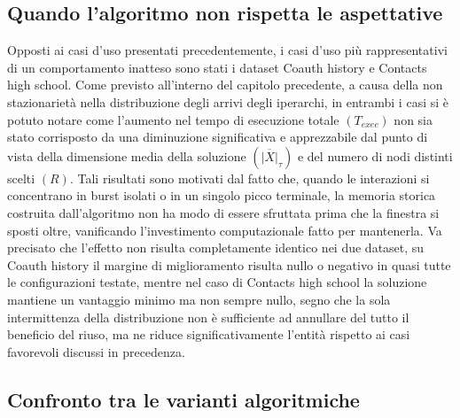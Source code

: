\subsection*{Quando l'algoritmo non rispetta le aspettative}

Opposti ai casi d'uso presentati precedentemente, i casi d'uso più rappresentativi di un comportamento inatteso sono stati i dataset Coauth history e Contacts high school.
Come previsto all'interno del capitolo precedente, a causa della non stazionarietà nella distribuzione degli arrivi degli iperarchi, in entrambi i casi si è potuto notare come l'aumento nel tempo di esecuzione totale $(T_{exec})$ non sia stato corrisposto da una diminuzione significativa e apprezzabile dal punto di vista della dimensione media della soluzione $(\overline{|X|}_{\tau})$ e del numero di nodi distinti scelti $(R)$.
Tali risultati sono motivati dal fatto che, quando le interazioni si concentrano in burst isolati o in un singolo picco terminale, la memoria storica costruita dall'algoritmo non ha modo di essere sfruttata prima che la finestra si sposti oltre, vanificando l'investimento computazionale fatto per mantenerla.
Va precisato che l'effetto non risulta completamente identico nei due dataset, su Coauth history il margine di miglioramento risulta nullo o negativo in quasi tutte le configurazioni testate, mentre nel caso di Contacts high school la soluzione mantiene un vantaggio minimo ma non sempre nullo, segno che la sola intermittenza della distribuzione non è sufficiente ad annullare del tutto il beneficio del riuso, ma ne riduce significativamente l'entità rispetto ai casi favorevoli discussi in precedenza.

\subsection*{Confronto tra le varianti algoritmiche}

